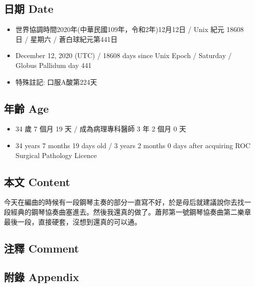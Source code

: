 \documentclass[a5paper, 11pt
]{book}
\providecommand{\tightlist}{%
  \setlength{\itemsep}{0pt}\setlength{\parskip}{0pt}}
\begin{document}
\hypertarget{ux65e5ux671f-date-11}{%
\subsection{日期 Date}\label{ux65e5ux671f-date-11}}

\begin{itemize}
\tightlist
\item
  世界協調時間2020年(中華民國109年，令和2年)12月12日 / Unix 紀元 18608
  日 / 星期六 / 蒼白球紀元第441日
\item
  December 12, 2020 (UTC) / 18608 days since Unix Epoch / Saturday /
  Globus Pallidum day 441
\item
  特殊註記: 口服A酸第224天
\end{itemize}

\hypertarget{ux5e74ux9f61-age-11}{%
\subsection{年齡 Age}\label{ux5e74ux9f61-age-11}}

\begin{itemize}
\tightlist
\item
  34 歲 7 個月 19 天 / 成為病理專科醫師 3 年 2 個月 0 天
\item
  34 years 7 months 19 days old / 3 years 2 months 0 days after
  acquiring ROC Surgical Pathology Licence
\end{itemize}

\hypertarget{ux672cux6587-content-11}{%
\subsection{本文 Content}\label{ux672cux6587-content-11}}

今天在編曲的時候有一段鋼琴主奏的部分一直寫不好，於是母后就建議說你去找一段經典的鋼琴協奏曲塞進去。然後我還真的做了。蕭邦第一號鋼琴協奏曲第二樂章最後一段，直接硬套，沒想到還真的可以通。

\hypertarget{ux6ce8ux91cb-comment-11}{%
\subsection{注釋 Comment}\label{ux6ce8ux91cb-comment-11}}

\hypertarget{ux9644ux9304-appendix-11}{%
\subsection{附錄 Appendix}\label{ux9644ux9304-appendix-11}}
\end{document}
